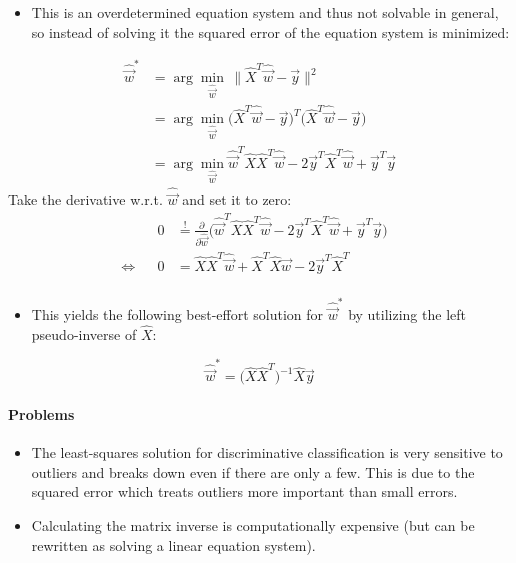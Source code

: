 		\begin{itemize}
			\item This is an overdetermined equation system and thus not solvable in general, so instead of solving it the squared error of the equation system is minimized:
		\end{itemize}
		\begin{align} %
			\hat{\vec{w}}^\ast & = \arg\min\limits_{\hat{\vec{w}}} \, \lVert \hat{X}^T \hat{\vec{w}} - \vec{y} \rVert^2                                                  \\
			                   & = \arg\min\limits_{\hat{\vec{w}}} \big( \hat{X}^T \hat{\vec{w}} - \vec{y} \big)^T \big( \hat{X}^T \hat{\vec{w}} - \vec{y} \big)         \\
			                   & = \arg\min\limits_{\hat{\vec{w}}} \hat{\vec{w}}^T \hat{X} \hat{X}^T \hat{\vec{w}} - 2\vec{y}^T\hat{X}^T\hat{\vec{w}} + \vec{y}^T\vec{y}
		\end{align}
		Take the derivative w.r.t. \( \hat{\vec{w}} \) and set it to zero:
		\begin{align}
			     &  & 0 & \overset{!}{=} \frac{\partial}{\partial \hat{\vec{w}}} \big( \hat{\vec{w}}^T \hat{X} \hat{X}^T \hat{\vec{w}} - 2\vec{y}^T\hat{X}^T\hat{\vec{w}} + \vec{y}^T\vec{y} \big) & \\
			\iff &  & 0 & = \hat{X} \hat{X}^T \hat{\vec{w}} + \hat{X}^T \hat{X} \hat{\vec{w}} - 2\vec{y}^T\hat{X}^T                                                                                & \\
		\end{align}
		\begin{itemize}
			\item This yields the following best-effort solution for \( \hat{\vec{w}}^\ast \) by utilizing the left pseudo-inverse of \(\hat{X}\):
		\end{itemize}
		\begin{equation}
			\hat{\vec{w}}^\ast = \big( \hat{X} \hat{X}^T \big)^{-1} \hat{X} \vec{y}
		\end{equation}

		\paragraph{Problems}
			\begin{itemize}
				\item The least-squares solution for discriminative classification is very sensitive to outliers and breaks down even if there are only a few. This is due to the squared error which treats outliers more important than small errors.
				\item Calculating the matrix inverse is computationally expensive (but can be rewritten as solving a linear equation system).
			\end{itemize}

